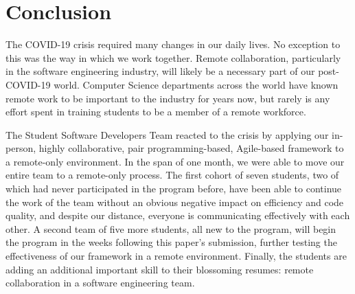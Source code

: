 \section{Conclusion}
The COVID-19 crisis required many changes in our daily lives. No exception to this was the way in which we work together. Remote collaboration, particularly in the software engineering industry, will likely be a necessary part of our post-COVID-19 world. Computer Science departments across the world have known remote work to be important to the industry for years now, but rarely is any effort spent in training students to be a member of a remote workforce.

The Student Software Developers Team reacted to the crisis by applying our in-person, highly collaborative, pair programming-based, Agile-based framework to a remote-only environment. In the span of one month, we were able to move our entire team to a remote-only process. The first cohort of seven students, two of which had never participated in the program before, have been able to continue the work of the team without an obvious negative impact on efficiency and code quality, and despite our distance, everyone is communicating effectively with each other. A second team of five more students, all new to the program, will begin the program in the weeks following this paper's submission, further testing the effectiveness of our framework in a remote environment. Finally, the students are adding an additional important skill to their blossoming resumes: remote collaboration in a software engineering team.
